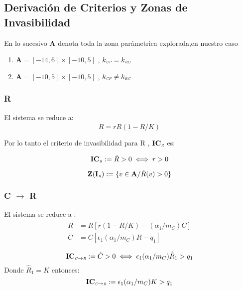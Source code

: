 


\subsection{Derivaci\'on de Criterios y Zonas de Invasibilidad}\label{subsec:CI}

En lo sucesivo $\mathbf{A}$ denota toda la zona par\'ametrica explorada,en nuestro caso 
\begin{enumerate}
\item $\mathbf{A} = [-14,6] \times [-10,5]$ , $k_{\textit{\tiny CP}} = k_{\textit{\tiny RC}}$
\item $\mathbf{A} = [-10,5] \times [-10,5]$ , $k_{\textit{\tiny CP}} \not= k_{\textit{\tiny RC}}$
\end{enumerate}

\subsubsection{R}
El sistema se reduce a:
\begin{equation}
\dot{R}= rR(1-R/K)
\end{equation}

Por lo tanto el criterio de invasibilidad para R , $\mathbf{IC_{\textit{\tiny R}}}$ es:

\begin{equation}\label{eq:ICR}
\mathbf{IC_{\textit{\tiny R}}} := \dot{R} > 0 \iff r > 0
\end{equation}

\begin{equation}
\mathbf{Z(I_{\textit{\tiny R}})} := \{ v \in \mathbf{A} / \dot{R}(v)>0 \}
\end{equation}

\subsubsection{C $\to$ R}
El sistema se reduce a :
\begin{equation}
\begin{aligned}
\dot{R} &= R\left[r(1-R/K)- (\alpha_{1}/m_C) C \right] \\
\dot{C} &= C \left[\epsilon_1 (\alpha_{1}/m_C) R  -q_1 \right]
\end{aligned}
\end{equation}


\begin{equation} \mathbf{IC_{\textit{\tiny C} \to \textit{\tiny R}}} := \dot{C} >0 \iff \epsilon_1(\alpha_1/m_C)\hat{R}_1 > q_1  \end{equation}
Donde $\hat{R}_1 = K$ entonces:
\begin{equation} \mathbf{IC_{\textit{\tiny C} \to \textit{\tiny R}}} := \epsilon_1(\alpha_1/m_C) K > q_1 \end{equation}
            
